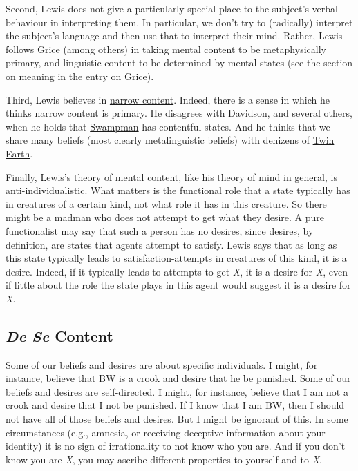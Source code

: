 Second, Lewis does not give a particularly special place to the subject's verbal behaviour in interpreting them. In particular, we don't try to (radically) interpret the subject's language and then use that to interpret their mind. Rather, Lewis follows Grice (among others) in taking mental content to be metaphysically primary, and linguistic content to be determined by mental states (see the section on meaning in the entry on \href{http://plato.stanford.edu/grice/index.html#Mea}{Grice}).

Third, Lewis believes in \href{http://plato.stanford.edu/content-narrow/}{narrow content}. Indeed, there is a sense in which he thinks narrow content is primary. He disagrees with Davidson, and several others, when he holds that \href{http://plato.stanford.edu/content-teleological/index.html#4.2}{Swampman} has contentful states. And he thinks that we share many beliefs (most clearly metalinguistic beliefs) with denizens of \href{http://plato.stanford.edu/content-narrow/index.html#put}{Twin Earth}. 

Finally, Lewis's theory of mental content, like his theory of mind in general, is anti-individualistic. What matters is the functional role that a state typically has in creatures of a certain kind, not what role it has in this creature. So there might be a madman who does not attempt to get what they desire. A pure functionalist may say that such a person has no desires, since desires, by definition, are states that agents attempt to satisfy. Lewis says that as long as this state typically leads to satisfaction-attempts in creatures of this kind, it is a desire. Indeed, if it typically leads to attempts to get \textit{X}, it is a desire for \textit{X}, even if little about the role the state plays in this agent would suggest it is a desire for \textit{X}.

\subsection{\textit{De Se} Content} 
Some of our beliefs and desires are about specific individuals. I might, for instance, believe that BW is a crook and desire that he be punished. Some of our beliefs and desires are self-directed. I might, for instance, believe that I am not a crook and desire that I not be punished. If I know that I am BW, then I should not have all of those beliefs and desires. But I might be ignorant of this. In some circumstances (e.g., amnesia, or receiving deceptive information about your identity) it is no sign of irrationality to not know who you are. And if you don't know you are \textit{X}, you may ascribe different properties to yourself and to \textit{X}.

